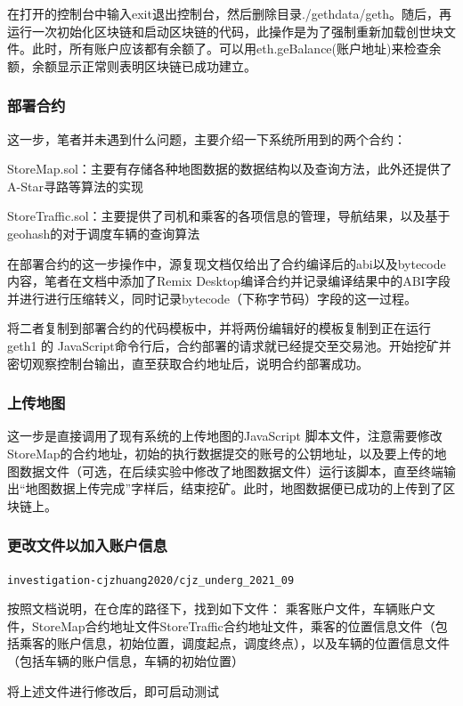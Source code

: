 在打开的控制台中输入exit退出控制台，然后删除目录./gethdata/geth。随后，再运行一次初始化区块链和启动区块链的代码，此操作是为了强制重新加载创世块文件。此时，所有账户应该都有余额了。可以用eth.geBalance(账户地址)来检查余额，余额显示正常则表明区块链已成功建立。

\subsubsection{部署合约}

这一步，笔者并未遇到什么问题，主要介绍一下系统所用到的两个合约：

StoreMap.sol：主要有存储各种地图数据的数据结构以及查询方法，此外还提供了A-Star寻路等算法的实现

StoreTraffic.sol：主要提供了司机和乘客的各项信息的管理，导航结果，以及基于geohash的对于调度车辆的查询算法

在部署合约的这一步操作中，源复现文档仅给出了合约编译后的abi以及bytecode内容，笔者在文档中添加了Remix Desktop编译合约并记录编译结果中的ABI字段并进行进行压缩转义，同时记录bytecode（下称字节码）字段的这一过程。

将二者复制到部署合约的代码模板中，并将两份编辑好的模板复制到正在运行 geth1 的 JavaScript命令行后，合约部署的请求就已经提交至交易池。开始挖矿并密切观察控制台输出，直至获取合约地址后，说明合约部署成功。

\subsubsection{上传地图}

这一步是直接调用了现有系统的上传地图的JavaScript 脚本文件，注意需要修改StoreMap的合约地址，初始的执行数据提交的账号的公钥地址，以及要上传的地图数据文件（可选，在后续实验中修改了地图数据文件）运行该脚本，直至终端输出“地图数据上传完成”字样后，结束挖矿。此时，地图数据便已成功的上传到了区块链上。

\subsubsection{更改文件以加入账户信息}

\verb|investigation-cjzhuang2020/cjz_underg_2021_09|

按照文档说明，在仓库的路径下，找到如下文件：
乘客账户文件，车辆账户文件，StoreMap合约地址文件StoreTraffic合约地址文件，乘客的位置信息文件（包括乘客的账户信息，初始位置，调度起点，调度终点），以及车辆的位置信息文件（包括车辆的账户信息，车辆的初始位置）

将上述文件进行修改后，即可启动测试


